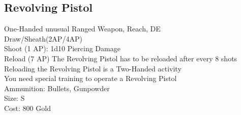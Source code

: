 \subsection{Revolving Pistol}\label{weapon:revolvingPistol}
One-Handed unusual Ranged Weapon,  Reach, DE\\
Draw/Sheath(2AP/4AP)\\
Shoot (1 AP): 1d10 Piercing Damage\\
Reload (7 AP) The Revolving Pistol has to be reloaded after every 8 shots\\
Reloading the Revolving Pistol is a Two-Handed activity\\
You need special training to operate a Revolving Pistol\\
Ammunition: Bullets, Gunpowder\\
Size: S\\
Cost: 800 Gold\\